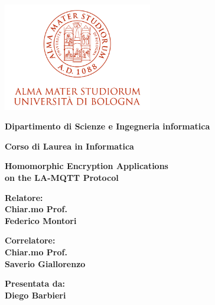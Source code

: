 \documentclass[12pt,a4paper,twoside]{book}
\begin{document}
\pagestyle{empty}

\begin{titlepage}

\begin{center}

\includegraphics[width=6.5cm,height=4.7cm]{img/marchio-di-ateneo.png}

\vspace{10mm}

{\large{\bf{Dipartimento di Scienze e Ingegneria informatica}}} 

\vspace{5mm}

{\Large{\bf{Corso di Laurea in Informatica}}}

\vspace{15mm}

{\Huge{\bf Homomorphic Encryption Applications }}\\
\vspace{3mm}
{\Huge{\bf on the LA-MQTT Protocol}}\\
\vspace{3mm}

\end{center}

\vspace{10mm}

\begin{minipage}[t]{0.40\textwidth}
{\Large{\bf Relatore: \\ Chiar.mo Prof.\\ Federico Montori}}

\vspace{3mm}

{\Large{\bf Correlatore: \\ Chiar.mo Prof.\\ Saverio Giallorenzo}}
\end{minipage}
\hfill
\begin{minipage}[t]{0.40\textwidth}\raggedleft
{\Large{\bf Presentata da: \\ Diego Barbieri}}
\end{minipage}


\end{titlepage}
\end{document}
